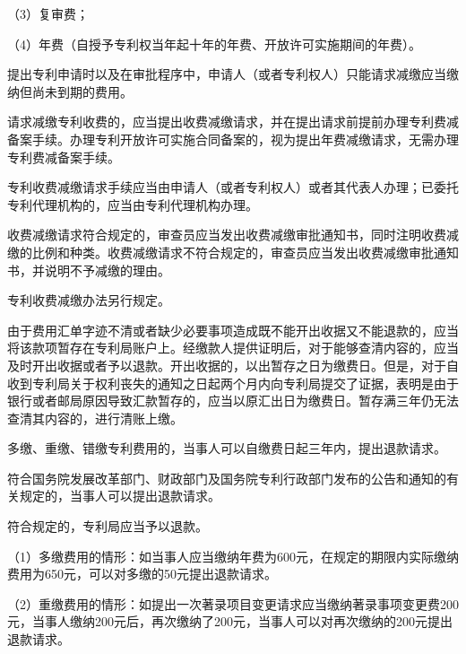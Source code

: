 {\setlength{\parindent}{17.1bp}（3）复审费；\par}

{\setlength{\parindent}{17.1bp}（4）年费（自授予专利权当年起十年的年费、开放许可实施期间的年费）。\par}

提出专利申请时以及在审批程序中，申请人（或者专利权人）只能请求减缴应当缴纳但尚未到期的费用。

请求减缴专利收费的，应当提出收费减缴请求，并在提出请求前提前办理专利费减备案手续。办理专利开放许可实施合同备案的，视为提出年费减缴请求，无需办理专利费减备案手续。

专利收费减缴请求手续应当由申请人（或者专利权人）或者其代表人办理；已委托专利代理机构的，应当由专利代理机构办理。

收费减缴请求符合规定的，审查员应当发出收费减缴审批通知书，同时注明收费减缴的比例和种类。收费减缴请求不符合规定的，审查员应当发出收费减缴审批通知书，并说明不予减缴的理由。

专利收费减缴办法另行规定。

由于费用汇单字迹不清或者缺少必要事项造成既不能开出收据又不能退款的，应当将该款项暂存在专利局账户上。经缴款人提供证明后，对于能够查清内容的，应当及时开出收据或者予以退款。开出收据的，以出暂存之日为缴费日。但是，对于自收到专利局关于权利丧失的通知之日起两个月内向专利局提交了证据，表明是由于银行或者邮局原因导致汇款暂存的，应当以原汇出日为缴费日。暂存满三年仍无法查清其内容的，进行清账上缴。

多缴、重缴、错缴专利费用的，当事人可以自缴费日起三年内，提出退款请求。

符合国务院发展改革部门、财政部门及国务院专利行政部门发布的公告和通知的有关规定的，当事人可以提出退款请求。

符合规定的，专利局应当予以退款。

{\setlength{\parindent}{17.5bp}（1）多缴费用的情形：如当事人应当缴纳年费为600元，在规定的期限内实际缴纳费用为650元，可以对多缴的50元提出退款请求。\par}

{\setlength{\parindent}{17.5bp}（2）重缴费用的情形：如提出一次著录项目变更请求应当缴纳著录事项变更费200元，当事人缴纳200元后，再次缴纳了200元，当事人可以对再次缴纳的200元提出退款请求。\par}

